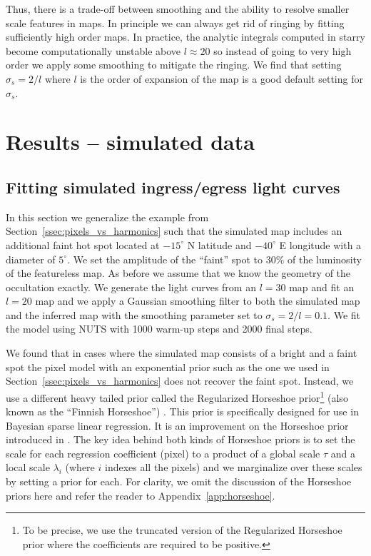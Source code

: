 \documentclass[linenumbers,modern]{aastex62}
\begin{document}
Thus, there is a trade-off between smoothing and the ability to resolve smaller scale features
in maps. 
In principle we can always get rid of ringing by fitting sufficiently high order maps.
In practice, the analytic integrals computed in \textsf{starry} become computationally unstable above $l\approx 20$ so instead of going to very high order we apply some smoothing to mitigate the ringing.
We find that setting $\sigma_s=2/l$ where $l$ is the order of expansion of the map  is a good default setting for $\sigma_s$.

\section{Results -- simulated data}
\label{sec:results_sim}
\subsection{Fitting simulated ingress/egress light curves}
\label{ssec:fitting_sim_ingress_egress}
In this section we generalize the example from Section~\ref{ssec:pixels_vs_harmonics} such that the simulated map includes an additional faint hot spot located at $-15^\circ$ N latitude and $-40^\circ$ E longitude with a diameter of $5^\circ$.
We set the amplitude of the ``faint'' spot to 30\% of the luminosity of the featureless map.
As before we assume that we know the geometry of the occultation exactly.
We generate the light curves from an $l=30$ map and fit an $l=20$ map and we apply a Gaussian smoothing filter to both the simulated map and the inferred map with the smoothing parameter set to $\sigma_s=2/l=0.1$.
We fit the model using NUTS with 1000 warm-up steps and 2000 final steps. 

We found that in cases where the simulated map consists of a bright and a faint spot the pixel model with an exponential prior such as the one we used in Section~\ref{ssec:pixels_vs_harmonics} does not recover the faint spot. 
Instead, we use a different heavy tailed prior called the Regularized Horseshoe prior\footnote{To be precise, we use the truncated version of the Regularized Horseshoe prior where the coefficients are required to be positive.} (also known as the ``Finnish Horseshoe'') \citep{piironen2017}.
This prior is specifically designed for use in Bayesian sparse linear regression. 
It is an improvement on the Horseshoe prior introduced in \cite{carvalho2010a}.
The key idea behind both kinds of Horseshoe priors is to set the scale for each regression coefficient (pixel) to a product of a global scale $\tau$ and a local scale $\lambda_i$ (where $i$ indexes all the pixels) and we marginalize over these scales by setting a prior for each. 
For clarity, we omit the discussion of  the Horseshoe priors here and refer the reader to Appendix~\ref{app:horseshoe}.
\end{document}
